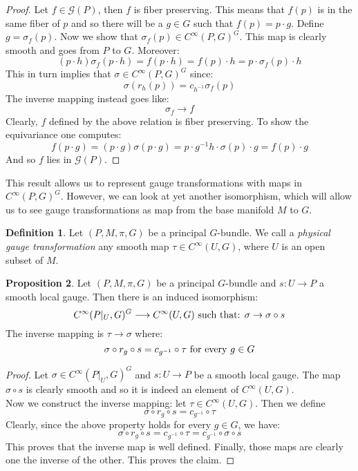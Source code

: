 \documentclass[12pt,a4paper]{report}
\theoremstyle{definition}
\newtheorem{Def}{Definition}[chapter]
\theoremstyle{Theorem}
\newtheorem{Prop}[Def]{Proposition}
\theoremstyle{definition}
\theoremstyle{definition}
\begin{document}
	\begin{proof}
		Let $f\in\mathcal{G}(P)$, then $f$ is fiber preserving. This means that $f(p)$ is in the same fiber of $p$ and so there will be a $g\in G$ such that $f(p)=p\cdot g$. Define $g=\sigma_f(p)$. Now we show that $\sigma_f(p)\in C^\infty(P,G)^G$. This map is clearly smooth and goes from $P$ to $G$. Moreover:
		$$(p\cdot h)\sigma_f(p\cdot h)=f(p\cdot h)=f(p)\cdot h=p\cdot \sigma_f(p)\cdot h$$
		This in turn implies that $\sigma\in C^\infty(P,G)^G$ since:
		$$\sigma(r_h(p))=c_{h^{-1}}\sigma_f(p)$$
		The inverse mapping instead goes like:
		$$\sigma_f\rightarrow f$$
		Clearly, $f$ defined by the above relation is fiber preserving. To show the equivariance one computes:
		$$f(p\cdot g)=(p\cdot g)\sigma(p\cdot g)=p\cdot g^{-1}h\cdot\sigma(p)\cdot g=f(p)\cdot g$$
		And so $f$ lies in $\mathcal{G}(P)$.
	\end{proof}
	This result allows us to represent gauge transformations with maps in $C^\infty(P,G)^G$. However, we can look at yet another isomorphism, which will allow us to see gauge transformations as map from the base manifold $M$ to $G$.
	\begin{Def}
		Let $(P,M,\pi,G)$ be a principal $G$-bundle. We call a \textit{physical gauge transformation} any smooth map $\tau\in C^\infty(U,G)$, where $U$ is an open subset of $M$.
	\end{Def} 
	\begin{Prop}\label{Prop_7.1.2}
		Let $(P,M,\pi,G)$ be a principal $G$-bundle and $s:U\rightarrow P$ a smooth local gauge. Then there is an induced isomorphism:
		$$C^\infty(P|_U,G)^G\longrightarrow C^\infty(U,G)\hbox{ such that: }\sigma\rightarrow \sigma\circ s$$
		The inverse mapping is $\tau\rightarrow \sigma$ where: 
		$$\sigma\circ r_g\circ s=c_{g^{-1}}\circ\tau\hbox{ for every } g\in G$$
	\end{Prop}
	\begin{proof}
		Let $\sigma\in C^\infty(P|_U,G)^G$ and $s:U\rightarrow P$ be a smooth local gauge. The map $\sigma\circ s$ is clearly smooth and so it is indeed an element of $C^\infty(U,G)$.\\
		Now we construct the inverse mapping: let $\tau\in C^\infty(U,G)$. Then we define 
		$$\sigma\circ r_g\circ s=c_{g^{-1}}\circ\tau$$
		Clearly, since the above property holds for every $g\in G$, we have:
		$$\sigma\circ r_g\circ s=c_{g^{-1}}\circ \tau=c_{g^{-1}}\circ \sigma\circ s$$
		This proves that the inverse map is well defined. Finally, those maps are clearly one the inverse of the other. This proves the claim.
	\end{proof}
\end{document}

